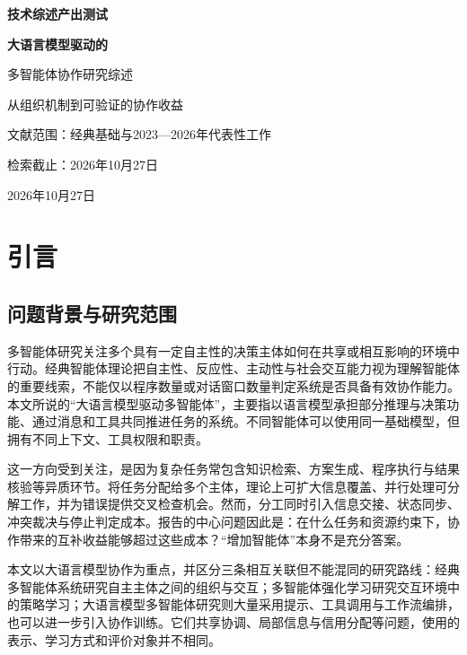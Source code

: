 \documentclass[UTF8,a4paper,fontset=fandol,zihao=5,openany]{ctexrep}
\begin{document}
\fontsize{10.5}{13.125}\selectfont
\pagestyle{empty}
\begin{titlepage}
\centering
\vspace*{28mm}
{\heiti\bfseries\fontsize{22}{30}\selectfont 技术综述产出测试\par}
\vspace{24mm}
{\heiti\bfseries\fontsize{20}{30}\selectfont 大语言模型驱动的\par 多智能体协作研究综述\par}
\vspace{22mm}
{\fontsize{13}{24}\selectfont 从组织机制到可验证的协作收益\par}
\vspace{15mm}
{\fontsize{11}{20}\selectfont 文献范围：经典基础与2023—2026年代表性工作\par 检索截止：2026年10月27日\par}
\vfill
{2026年10月27日\par}
\vspace*{15mm}
\end{titlepage}
\tableofcontents
\thispagestyle{empty}
\clearpage
{}
\pagestyle{plain}

\chapter{引言}

\section{问题背景与研究范围}
多智能体研究关注多个具有一定自主性的决策主体如何在共享或相互影响的环境中行动。经典智能体理论把自主性、反应性、主动性与社会交互能力视为理解智能体的重要线索，不能仅以程序数量或对话窗口数量判定系统是否具备有效协作能力。\cite{wooldridge} 本文所说的“大语言模型驱动多智能体”，主要指以语言模型承担部分推理与决策功能、通过消息和工具共同推进任务的系统。不同智能体可以使用同一基础模型，但拥有不同上下文、工具权限和职责。

这一方向受到关注，是因为复杂任务常包含知识检索、方案生成、程序执行与结果核验等异质环节。将任务分配给多个主体，理论上可扩大信息覆盖、并行处理可分解工作，并为错误提供交叉检查机会。然而，分工同时引入信息交接、状态同步、冲突裁决与停止判定成本。报告的中心问题因此是：在什么任务和资源约束下，协作带来的互补收益能够超过这些成本？“增加智能体”本身不是充分答案。

本文以大语言模型协作为重点，并区分三条相互关联但不能混同的研究路线：经典多智能体系统研究自主主体之间的组织与交互；多智能体强化学习研究交互环境中的策略学习；大语言模型多智能体研究则大量采用提示、工具调用与工作流编排，也可以进一步引入协作训练。它们共享协调、局部信息与信用分配等问题，使用的表示、学习方式和评价对象并不相同。
\end{document}
